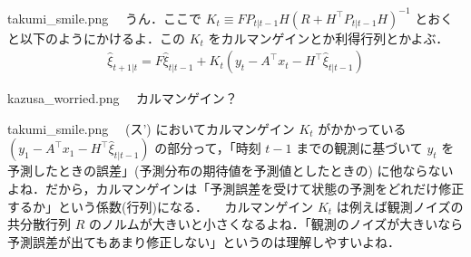 \documentclass[b5paper,xelatex,ja=standard,10pt]{bxjsarticle}
\begin{document}
\begin{SERIFU}[colback=PaleGold,colbacktitle=PaleGold2]{takumi_smile.png}
　うん．ここで $K_t \equiv FP_{t|t-1} H (R + H^\top P_{t|t-1} H)^{-1}$ とおくと以下のようにかけるよ．この $K_t$ をカルマンゲインとか利得行列とかよぶ．
\begin{align}
\hat{\xi}_{t+1|t} = F\hat{\xi}_{t|t-1} + K_t (y_t - A^\top x_t - H^\top \hat{\xi}_{t|t-1}) \tag{ス'}
\end{align}
\end{SERIFU}


\begin{SERIFU}[colback=PaleIris,colbacktitle=PaleIris2]{kazusa_worried.png}
　カルマンゲイン？
\end{SERIFU}


\begin{SERIFU}[colback=PaleGold,colbacktitle=PaleGold2]{takumi_smile.png}
　(ス') においてカルマンゲイン $K_t$ がかかっている $(y_1 - A^\top x_1 - H^\top \hat{\xi}_{t|t-1})$ の部分って，「時刻 $t-1$ までの観測に基づいて $y_t$ を予測したときの誤差」(予測分布の期待値を予測値としたときの) に他ならないよね．だから，カルマンゲインは「予測誤差を受けて状態の予測をどれだけ修正するか」という係数(行列)になる．
　カルマンゲイン $K_t$ は例えば観測ノイズの共分散行列 $R$ のノルムが大きいと小さくなるよね．「観測のノイズが大きいなら予測誤差が出てもあまり修正しない」というのは理解しやすいよね．
\end{SERIFU}

\end{document}
